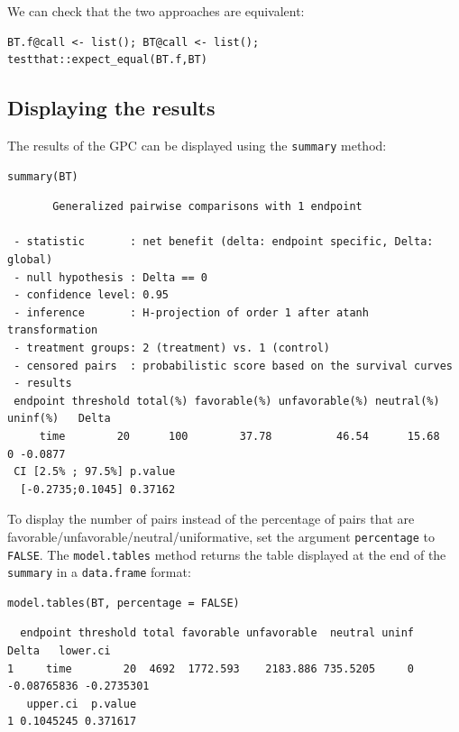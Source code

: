 \documentclass[12pt]{article}
\begin{document}
We can check that the two approaches are equivalent:
\lstset{language=r,label= ,caption= ,captionpos=b,numbers=none}
\begin{lstlisting}
BT.f@call <- list(); BT@call <- list();
testthat::expect_equal(BT.f,BT)
\end{lstlisting}

\subsection{Displaying the results}
\label{sec:orgad6051f}

The results of the GPC can be displayed using the \texttt{summary} method:
\lstset{language=r,label= ,caption= ,captionpos=b,numbers=none}
\begin{lstlisting}
summary(BT)
\end{lstlisting}

\begin{verbatim}
       Generalized pairwise comparisons with 1 endpoint

 - statistic       : net benefit (delta: endpoint specific, Delta: global) 
 - null hypothesis : Delta == 0 
 - confidence level: 0.95 
 - inference       : H-projection of order 1 after atanh transformation 
 - treatment groups: 2 (treatment) vs. 1 (control) 
 - censored pairs  : probabilistic score based on the survival curves
 - results
 endpoint threshold total(%) favorable(%) unfavorable(%) neutral(%) uninf(%)   Delta
     time        20      100        37.78          46.54      15.68        0 -0.0877
 CI [2.5% ; 97.5%] p.value 
  [-0.2735;0.1045] 0.37162
\end{verbatim}

 To display the number of pairs instead of the percentage of pairs
that are favorable/unfavorable/neutral/uniformative, set the argument
\texttt{percentage} to \texttt{FALSE}. The \texttt{model.tables} method returns the table
displayed at the end of the \texttt{summary} in a \texttt{data.frame} format:
\lstset{language=r,label= ,caption= ,captionpos=b,numbers=none}
\begin{lstlisting}
model.tables(BT, percentage = FALSE)
\end{lstlisting}

\begin{verbatim}
  endpoint threshold total favorable unfavorable  neutral uninf       Delta   lower.ci
1     time        20  4692  1772.593    2183.886 735.5205     0 -0.08765836 -0.2735301
   upper.ci  p.value
1 0.1045245 0.371617
\end{verbatim}
\end{document}
